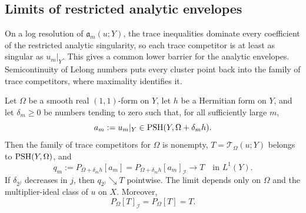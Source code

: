 \subsection{Limits of restricted analytic envelopes}

On a log resolution of $\mathfrak a_m(u;Y)$, the trace inequalities dominate every coefficient of the restricted analytic singularity, so each trace competitor is at least as singular as $u_m|_Y$. This gives a common lower barrier for the analytic envelopes. Semicontinuity of Lelong numbers puts every cluster point back into the family of trace competitors, where maximality identifies it.

\begin{theorem}\label{thm:restricted-analytic-envelope-limit}
Let $\Omega$ be a smooth real $(1,1)$-form on $Y$, let $h$ be a Hermitian form on $Y$, and let $\delta_m\geq0$ be numbers tending to zero such that, for all sufficiently large $m$,
\[
 a_m:=u_m|_Y\in\mathrm{PSH}(Y,\Omega+\delta_m h).
\]
Then the family of trace competitors for $\Omega$ is nonempty, $T=\mathcal T_\Omega(u;Y)$ belongs to $\mathrm{PSH}(Y,\Omega)$, and
\begin{equation}\label{eq:restricted-analytic-envelope-limit}
 q_m:=P_{\Omega+\delta_m h}[a_m]
     =P_{\Omega+\delta_m h}[a_m]_{\mathcal I}
       \longrightarrow T\quad\text{in }L^1(Y).
\end{equation}
If $\delta_{2^j}$ decreases in $j$, then $q_{2^j}\searrow T$ pointwise. The limit depends only on $\Omega$ and the multiplier-ideal class of $u$ on $X$. Moreover,
\[
 P_\Omega[T]_{\mathcal I}=P_\Omega[T]=T.
\]
\end{theorem}
